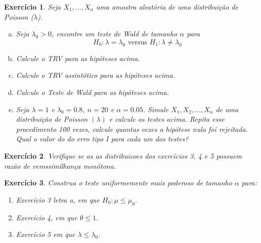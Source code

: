 \documentclass[letter,11pt]{article}
\newtheorem{exer}{Exercício}
\begin{document}
\begin{exer} \rm
Seja $X_1, \ldots, X_n$ uma amostra aleatória de uma distribuição de Poisson ($\lambda$).
  \begin{enumerate}[a)]
    \item Seja $\lambda_0>0$, encontre um teste de Wald de tamanho $\alpha$ para
$$
H_0: \lambda=\lambda_0  \mbox{ versus } H_1: \lambda \neq \lambda_0
$$

    \item Calcule o TRV para as hipóteses acima.

    \item Calcule o TRV assintótico para as hipóteses acima. 
  
    \item Calcule o Teste de Wald para as hipóteses acima.

    \item Seja $\lambda=1$ e $\lambda_0=0.8$, $n=20$ e $\alpha=0.05$. Simule $X_1, X_2, \ldots, X_n$ de uma distribuição de Poisson $(\lambda)$ e calcule os testes acima. Repita esse procedimento 100 vezes, calcule quantas vezes a hipótese nula foi rejeitada. Qual o valor do do erro tipo I para cada um dos testes?
\end{enumerate}
\end{exer}


\begin{exer} \rm
Verifique se as as distribuicoes dos exercícios 3, 4 e 5 possuem razão de verossimilhança monótona. 
\end{exer}


\begin{exer} \rm
Construa o teste uniformemente mais poderoso de tamanho $\alpha$ para:

  \begin{enumerate}
    \item Exercício 3 letra a, em que $H_0: \mu \leq \mu_0$.
    
    \item Exercício 4, em que $\theta \leq 1$.
    
    \item Exercício 5 em que $\lambda \leq \lambda_0$.
  \end{enumerate}
\end{exer}
\end{document}
